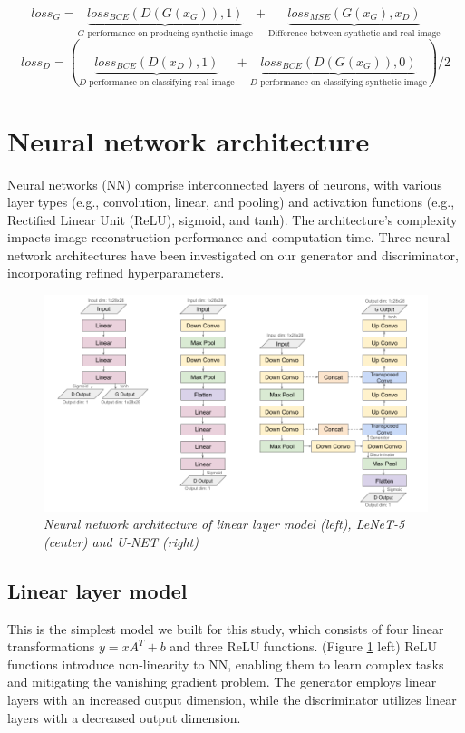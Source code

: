 \begin{equation}
loss_{G} = \underbrace{loss_{BCE}(D(G(x_{G})),1)}_\text{$G$ performance on producing synthetic image} + \underbrace{loss_{MSE}(G(x_{G}),x_{D})}_\text{Difference between synthetic and real image}
\label{eq:loss_G}
\end{equation}
\begin{equation}
loss_{D} = (\underbrace{loss_{BCE}(D(x_{D}),1)}_\text{$D$ performance on classifying real image} + \underbrace{loss_{BCE}(D(G(x_{G})),0)}_\text{$D$ performance on classifying synthetic image})/2
\label{eq:loss_D}
\end{equation}
 
\section{Neural network architecture}
Neural networks (NN) comprise interconnected layers of neurons, with various layer types (e.g., convolution, linear, and pooling) and activation functions (e.g., Rectified Linear Unit (ReLU), sigmoid, and tanh). The architecture's complexity impacts image reconstruction performance and computation time. Three neural network architectures have been investigated on our generator and discriminator, incorporating refined hyperparameters.

\begin{figure}[H]
    \centering
    \includegraphics[width=\textwidth]{Figure/Front_page/Network architecture.png}
    \caption{\textit{Neural network architecture of linear layer model (left), LeNeT-5 (center) and U-NET (right)}}
    \label{fig:archi}
\end{figure}

\subsection{Linear layer model} \label{sub:linear}
This is the simplest model we built for this study, which consists of four linear transformations $y=xA^{T}+b$ and three ReLU functions. (Figure \ref{fig:archi} left) ReLU functions introduce non-linearity to NN, enabling them to learn complex tasks and mitigating the vanishing gradient problem. The generator employs linear layers with an increased output dimension, while the discriminator utilizes linear layers with a decreased output dimension.


